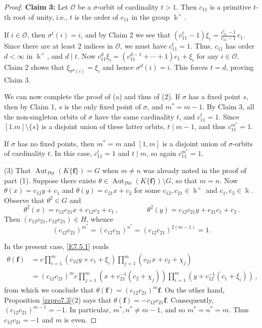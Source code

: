 \documentclass[10pt,a4paper]{amsart}
\DeclareMathOperator{\Aut}{Aut}
\newcommand \bff {{\mathbf{f}}}
\newcommand \calO {{\mathcal{O}}}
\newcommand \kx {\Bbbk^\times}
\begin{document}
\begin{proof}
\textbf{Claim 3:} Let $\calO$ be a $\sigma$-orbit of cardinality $t>1$.  Then $c_{11}$ is a primitive $t$-th root of unity, i.e., $t$ is the order of $c_{11}$ in the group $\kx$.

If $i \in \calO$, then $\sigma^t(i) = i$, and by Claim 2 we see that $(c_{11}^t - 1) \xi_i = \frac{c_{11}^t-1}{c_{11}-1}\, c_1$.  Since there are at least $2$ indices in $\calO$, we must have $c_{11}^t = 1$.  Thus, $c_{11}$ has order $d<\infty$ in $\kx$, and $d \mid t$.  Now $c_{11}^d \xi_i = (c_{11}^{d-1} + \cdots + 1) c_1 + \xi_i$ for any $i \in \calO$.  Claim 2 shows that $\xi_{\sigma^d(i)} = \xi_i$ and hence $\sigma^d(i) = i$.  This forces $t=d$, proving Claim 3.

We can now complete the proof of (a) and thus of (2).  If $\sigma$ has a fixed point $s$, then by Claim 1, $s$ is the only fixed point of $\sigma$, and $m^* = m-1$.  By Claim 3, all the non-singleton orbits of $\sigma$ have the same cardinality $t$, and $c_{11}^t = 1$.  Since $[1.m] \setminus \{s\}$ is a disjoint union of these latter orbits, $t \mid m-1$, and thus $c_{11}^{m^*} = 1$.

If $\sigma$ has no fixed points, then $m^* = m$ and $[1,m]$ is a disjoint union of $\sigma$-orbits of cardinality $t$.  In this case, $c_{11}^t = 1$ and $t \mid m$, so again $c_{11}^{m^*} = 1$.

(3) That $\Aut_{Poi}(K\{\bff\}) = G$ when $m \ne n$ was already noted in the proof of part (1).  Suppose there exists $\theta \in \Aut_{Poi}(K\{\bff\}) \setminus G$, so that $m=n$.  Now $\theta(x) = c_{12}y+c_1$ and $\theta(y) = c_{21}x+c_2$ for some $c_{12},c_{21} \in \kx$ and $c_1,c_2 \in \Bbbk$.  Observe that $\theta^2 \in G$ and
$$
\theta^2(x) = c_{12}c_{21} x + c_{12}c_2+c_1 \,, \qquad\qquad \theta^2(y) = c_{12}c_{21} y + c_{21}c_1+c_2 \,.
$$
Then $(c_{12}c_{21}, c_{12}c_{21}) \in H$, whence
$$
(c_{12}c_{21})^{m^*} = (c_{12}c_{21})^{n^*} = (c_{12}c_{21})^{2(m-1)} = 1.
$$

In the present case, \eqref{E7.5.1} reads
\begin{align*}
\theta(\bff) &= c \prod_{i=1}^m (c_{12}y+c_1+\xi_i) \prod_{j=1}^m (c_{21}x+c_2+\chi_j)  \\
&= (c_{12}c_{21})^m c \prod_{j=1}^m (x+c_{21}^{-1}(c_2+\chi_j)) \prod_{i=1}^m (y+c_{12}^{-1}(c_1+\xi_i)) \,,
\end{align*}
from which we conclude that $\theta(\bff) = (c_{12}c_{21})^m \bff$.  On the other hand, Proposition \ref{zzpro7.3}(2) says that $\theta(\bff) = - c_{12}c_{21} \bff$.  Consequently, $(c_{12}c_{21})^{m-1} = -1$.  In particular, $m^*,n^* \ne m-1$, and so $m^*=n^* = m$.  Thus $c_{12}c_{21} = -1$ and $m$ is even.


\end{proof}
\end{document}
